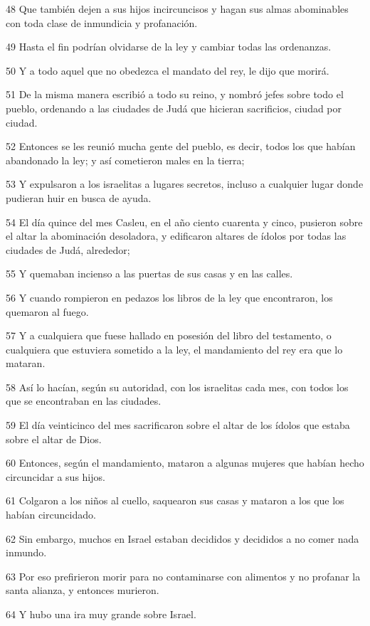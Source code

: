\par 48 Que también dejen a sus hijos incircuncisos y hagan sus almas abominables con toda clase de inmundicia y profanación.
\par 49 Hasta el fin podrían olvidarse de la ley y cambiar todas las ordenanzas.
\par 50 Y a todo aquel que no obedezca el mandato del rey, le dijo que morirá.
\par 51 De la misma manera escribió a todo su reino, y nombró jefes sobre todo el pueblo, ordenando a las ciudades de Judá que hicieran sacrificios, ciudad por ciudad.
\par 52 Entonces se les reunió mucha gente del pueblo, es decir, todos los que habían abandonado la ley; y así cometieron males en la tierra;
\par 53 Y expulsaron a los israelitas a lugares secretos, incluso a cualquier lugar donde pudieran huir en busca de ayuda.
\par 54 El día quince del mes Casleu, en el año ciento cuarenta y cinco, pusieron sobre el altar la abominación desoladora, y edificaron altares de ídolos por todas las ciudades de Judá, alrededor;
\par 55 Y quemaban incienso a las puertas de sus casas y en las calles.
\par 56 Y cuando rompieron en pedazos los libros de la ley que encontraron, los quemaron al fuego.
\par 57 Y a cualquiera que fuese hallado en posesión del libro del testamento, o cualquiera que estuviera sometido a la ley, el mandamiento del rey era que lo mataran.
\par 58 Así lo hacían, según su autoridad, con los israelitas cada mes, con todos los que se encontraban en las ciudades.
\par 59 El día veinticinco del mes sacrificaron sobre el altar de los ídolos que estaba sobre el altar de Dios.
\par 60 Entonces, según el mandamiento, mataron a algunas mujeres que habían hecho circuncidar a sus hijos.
\par 61 Colgaron a los niños al cuello, saquearon sus casas y mataron a los que los habían circuncidado.
\par 62 Sin embargo, muchos en Israel estaban decididos y decididos a no comer nada inmundo.
\par 63 Por eso prefirieron morir para no contaminarse con alimentos y no profanar la santa alianza, y entonces murieron.
\par 64 Y hubo una ira muy grande sobre Israel.

